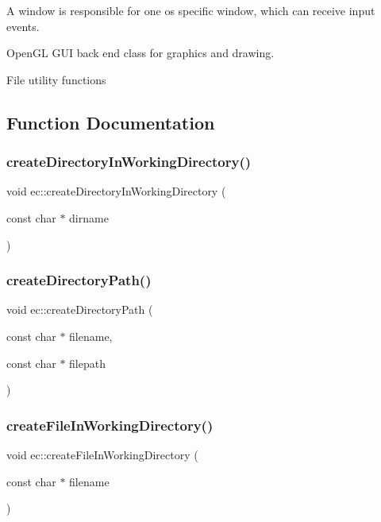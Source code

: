 A window is responsible for one os specific window, which can receive input events.

Open\+GL G\+UI back end class for graphics and drawing.

File utility functions 

\subsection{Function Documentation}
\mbox{\label{namespaceec_ae395ba21aba60fc9c2b339d7991c5454}} 
\subsubsection{\texorpdfstring{create\+Directory\+In\+Working\+Directory()}{createDirectoryInWorkingDirectory()}}
{\footnotesize\ttfamily void ec\+::create\+Directory\+In\+Working\+Directory (\begin{DoxyParamCaption}\item[{const char $\ast$}]{dirname }\end{DoxyParamCaption})}

\mbox{\label{namespaceec_aab3d6d61f368bf69b05e36f1f40ed05f}} 
\subsubsection{\texorpdfstring{create\+Directory\+Path()}{createDirectoryPath()}}
{\footnotesize\ttfamily void ec\+::create\+Directory\+Path (\begin{DoxyParamCaption}\item[{const char $\ast$}]{filename,  }\item[{const char $\ast$}]{filepath }\end{DoxyParamCaption})}

\mbox{\label{namespaceec_a46156b1f66d440209a29046d0267923b}} 
\subsubsection{\texorpdfstring{create\+File\+In\+Working\+Directory()}{createFileInWorkingDirectory()}}
{\footnotesize\ttfamily void ec\+::create\+File\+In\+Working\+Directory (\begin{DoxyParamCaption}\item[{const char $\ast$}]{filename }\end{DoxyParamCaption})}

